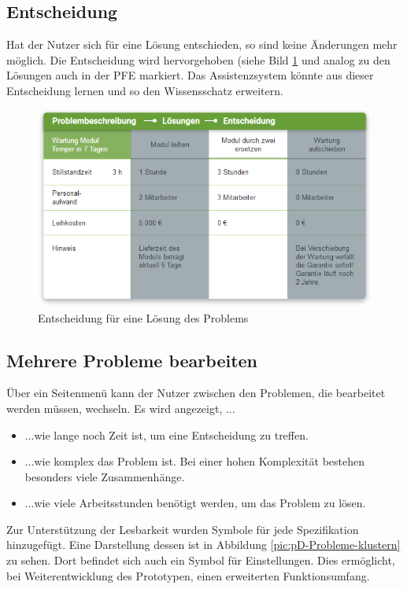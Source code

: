 \subsection{Entscheidung}
Hat der Nutzer sich für eine Lösung entschieden, so sind keine Änderungen mehr möglich. Die Entscheidung wird hervorgehoben (siehe Bild \ref{pic:pD-Entscheidung} und analog zu den Lösungen auch in der PFE markiert. Das Assistenzsystem könnte aus dieser Entscheidung lernen und so den Wissensschatz erweitern.
\begin{figure}[htbp]
\centering
\includegraphics[scale=0.7]{DA_files/Bilder/Konzept/Skizze-Entscheidung.png}
\caption{Entscheidung für eine Lösung des Problems}
\label{pic:pD-Entscheidung}
\end{figure}

\subsection{Mehrere Probleme bearbeiten}
Über ein Seitenmenü kann der Nutzer zwischen den Problemen, die bearbeitet werden müssen, wechseln. Es wird angezeigt, ...
\begin{itemize}
\item ...wie lange noch Zeit ist, um eine Entscheidung zu treffen.
\item ...wie komplex das Problem ist. Bei einer hohen Komplexität bestehen besonders viele Zusammenhänge.
\item ...wie viele Arbeitsstunden benötigt werden, um das Problem zu lösen.
\end{itemize}
Zur Unterstützung der Lesbarkeit wurden Symbole für jede Spezifikation hinzugefügt. Eine Darstellung dessen ist in Abbildung \ref{pic:pD-Probleme-klustern} zu sehen. Dort befindet sich auch ein Symbol für Einstellungen. Dies ermöglicht, bei Weiterentwicklung des Prototypen, einen erweiterten Funktionsumfang.

